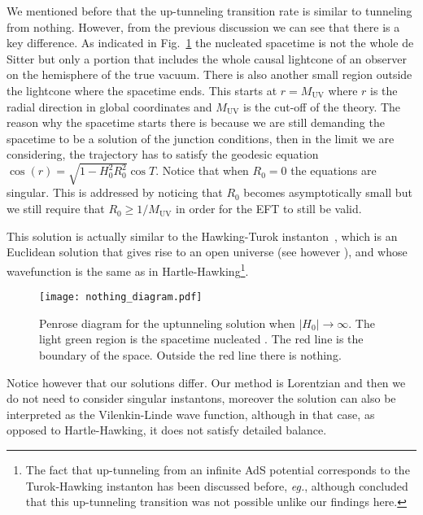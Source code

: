 \documentclass[a4paper,11pt]{article}
\numberwithin{equation}{section}
\numberwithin{equation}{section}
\begin{document}
We mentioned before that the up-tunneling transition rate is similar to tunneling from nothing.  However,  from the previous discussion we can see that there is a key difference.  As indicated in Fig.~\ref{fig:nothing} the  nucleated spacetime is not the whole de Sitter but only  a portion that includes  the whole  causal lightcone of an observer on the hemisphere of the true vacuum. There is also another small region outside the lightcone where the spacetime ends.  This starts at $r=M_{\mathrm{UV}}$ where $r$ is the radial direction in global coordinates and $M_{\mathrm{UV}}$ is the cut-off of the theory.  The reason why the spacetime starts  there is because we are still demanding the spacetime to be a solution of the junction conditions, then in the limit we are considering, the trajectory has to satisfy the geodesic equation $\cos(r)=\sqrt{1-H_0^2 R_0^2}\cos T$.  Notice that when $R_0=0$ the equations are singular. This is addressed by noticing that  $R_0$ becomes asymptotically small but  we still require that $R_0\geq 1/M_{\mathrm{UV}} $ in order for the EFT to still be valid. 


This solution is actually similar to the Hawking-Turok instanton~\cite{Hawking:1998bn},  which is an Euclidean solution that gives rise to  an open universe (see however \cite{Bousso:1998ed}),  and whose wavefunction is the same as in Hartle-Hawking\footnote{The fact that up-tunneling from an infinite AdS potential corresponds to the Turok-Hawking instanton has been discussed before, \textit{eg.}\cite{Garriga:1999xh, Brown:2011gt}, although \cite{Brown:2011gt} concluded that this up-tunneling transition was not possible unlike our findings here.}.\\
\begin{figure}[h!] 
\begin{center} 
\texttt{[image: nothing\_diagram.pdf]}
\caption{\footnotesize{Penrose diagram for the uptunneling solution when $\vert H_0\vert\to\infty$.  The light green region is the spacetime nucleated .  The red line is the boundary of the space.  Outside the red line there is nothing.\ } \label{fig:nothing}}
\end{center} 
\end{figure}

Notice however that our solutions differ.  Our method is Lorentzian and then we do not need to consider singular instantons, moreover the solution can also be interpreted as the  Vilenkin-Linde wave function, although in that case, as opposed to Hartle-Hawking,  it does not satisfy detailed balance.
\end{document}
